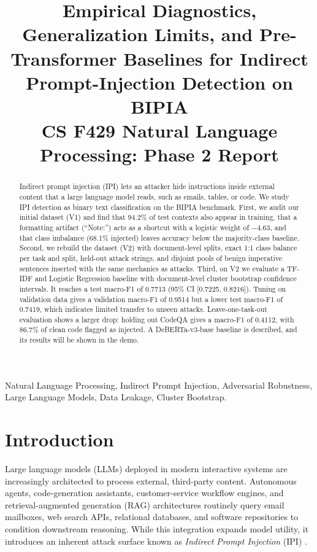 \documentclass[10pt,conference]{IEEEtran}
\title{Empirical Diagnostics, Generalization Limits, and Pre-Transformer Baselines for Indirect Prompt-Injection Detection on BIPIA\\
\large CS F429 Natural Language Processing: Phase 2 Report}
\author{
  \IEEEauthorblockN{Devansh Sharma (2022A3PS1298H), Group 18}
  \IEEEauthorblockA{Department of Computer Science and Information Systems\\
  Birla Institute of Technology and Science, Pilani, Hyderabad Campus}
}
\begin{document}
\maketitle

\begin{abstract}
Indirect prompt injection (IPI) lets an attacker hide instructions inside external content that a large language model reads, such as emails, tables, or code. We study IPI detection as binary text classification on the BIPIA benchmark. First, we audit our initial dataset (V1) and find that 94.2\% of test contexts also appear in training, that a formatting artifact (``Note:'') acts as a shortcut with a logistic weight of $-4.63$, and that class imbalance (68.1\% injected) leaves accuracy below the majority-class baseline. Second, we rebuild the dataset (V2) with document-level splits, exact 1:1 class balance per task and split, held-out attack strings, and disjoint pools of benign imperative sentences inserted with the same mechanics as attacks. Third, on V2 we evaluate a TF-IDF and Logistic Regression baseline with document-level cluster bootstrap confidence intervals. It reaches a test macro-F1 of 0.7713 (95\% CI [0.7225, 0.8216]). Tuning on validation data gives a validation macro-F1 of 0.9514 but a lower test macro-F1 of 0.7419, which indicates limited transfer to unseen attacks. Leave-one-task-out evaluation shows a larger drop: holding out CodeQA gives a macro-F1 of 0.4112, with 86.7\% of clean code flagged as injected. A DeBERTa-v3-base baseline is described, and its results will be shown in the demo.
\end{abstract}

\begin{IEEEkeywords}
Natural Language Processing, Indirect Prompt Injection, Adversarial Robustness, Large Language Models, Data Leakage, Cluster Bootstrap.
\end{IEEEkeywords}

\section{Introduction}

Large language models (LLMs) deployed in modern interactive systems are increasingly architected to process external, third-party content. Autonomous agents, code-generation assistants, customer-service workflow engines, and retrieval-augmented generation (RAG) architectures routinely query email mailboxes, web search APIs, relational databases, and software repositories to condition downstream reasoning. While this integration expands model utility, it introduces an inherent attack surface known as \textit{Indirect Prompt Injection} (IPI) \cite{greshake2023not}. 
\end{document}
